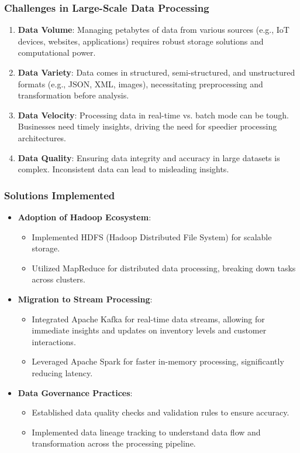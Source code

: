 \documentclass{beamer}
\begin{document}
\begin{frame}[fragile]
    \frametitle{Challenges in Large-Scale Data Processing}
    \begin{enumerate}
        \item \textbf{Data Volume}: Managing petabytes of data from various sources (e.g., IoT devices, websites, applications) requires robust storage solutions and computational power.
        
        \item \textbf{Data Variety}: Data comes in structured, semi-structured, and unstructured formats (e.g., JSON, XML, images), necessitating preprocessing and transformation before analysis.
        
        \item \textbf{Data Velocity}: Processing data in real-time vs. batch mode can be tough. Businesses need timely insights, driving the need for speedier processing architectures.
        
        \item \textbf{Data Quality}: Ensuring data integrity and accuracy in large datasets is complex. Inconsistent data can lead to misleading insights.
    \end{enumerate}
\end{frame}

\begin{frame}[fragile]
    \frametitle{Solutions Implemented}
    \begin{itemize}
        \item \textbf{Adoption of Hadoop Ecosystem}:
        \begin{itemize}
            \item Implemented HDFS (Hadoop Distributed File System) for scalable storage.
            \item Utilized MapReduce for distributed data processing, breaking down tasks across clusters.
        \end{itemize}
        
        \item \textbf{Migration to Stream Processing}:
        \begin{itemize}
            \item Integrated Apache Kafka for real-time data streams, allowing for immediate insights and updates on inventory levels and customer interactions.
            \item Leveraged Apache Spark for faster in-memory processing, significantly reducing latency.
        \end{itemize}
        
        \item \textbf{Data Governance Practices}:
        \begin{itemize}
            \item Established data quality checks and validation rules to ensure accuracy.
            \item Implemented data lineage tracking to understand data flow and transformation across the processing pipeline.
        \end{itemize}
    \end{itemize}
\end{frame}
\end{document}
